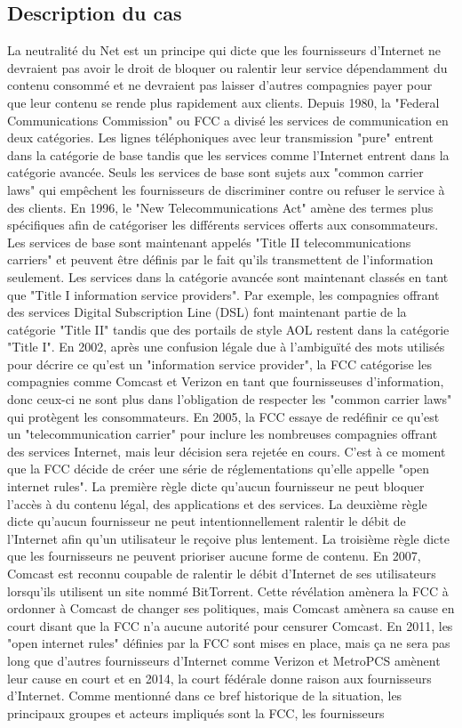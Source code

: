 \documentclass[12pt]{article}
\begin{document}
\subsection{Description du cas}
La neutralité du Net est un principe qui dicte que les fournisseurs d’Internet ne devraient pas avoir le droit de bloquer ou ralentir leur service dépendamment du contenu consommé et ne devraient pas laisser d’autres compagnies payer pour que leur contenu se rende plus rapidement aux clients. Depuis 1980, la "Federal Communications Commission" ou FCC a divisé les services de communication en deux catégories. Les lignes téléphoniques avec leur transmission "pure" entrent dans la catégorie de base tandis que les services comme l’Internet entrent dans la catégorie avancée. Seuls les services de base sont sujets aux "common carrier laws" qui empêchent les fournisseurs de discriminer contre ou refuser le service à des clients. En 1996, le "New Telecommunications Act" amène des termes plus spécifiques afin de catégoriser les différents services offerts aux consommateurs. Les services de base sont maintenant appelés "Title II telecommunications carriers" et peuvent être définis par le fait qu’ils transmettent de l’information seulement. Les services dans la catégorie avancée sont maintenant classés en tant que "Title I information service providers". Par exemple, les compagnies offrant des services Digital Subscription Line (DSL) font maintenant partie de la catégorie "Title II" tandis que des portails de style AOL restent dans la catégorie "Title I". En 2002, après une confusion légale due à l’ambiguïté des mots utilisés pour décrire ce qu’est un "information service provider", la FCC catégorise les compagnies comme Comcast et Verizon en tant que fournisseuses d’information, donc ceux-ci ne sont plus dans l’obligation de respecter les "common carrier laws" qui protègent les consommateurs. En 2005, la FCC essaye de redéfinir ce qu’est un "telecommunication carrier" pour inclure les nombreuses compagnies offrant des services Internet, mais leur décision sera rejetée en cours. C’est à ce moment que la FCC décide de créer une série de réglementations qu’elle appelle "open internet rules". La première règle dicte qu’aucun fournisseur ne peut bloquer l’accès à du contenu légal, des applications et des services. La deuxième règle dicte qu’aucun fournisseur ne peut intentionnellement ralentir le débit de l’Internet afin qu’un utilisateur le reçoive plus lentement. La troisième règle dicte que les fournisseurs ne peuvent prioriser aucune forme de contenu. En 2007, Comcast est reconnu coupable de ralentir le débit d’Internet de ses utilisateurs lorsqu’ils utilisent un site nommé BitTorrent. Cette révélation amènera la FCC à ordonner à Comcast de changer ses politiques, mais Comcast amènera sa cause en court disant que la FCC n’a aucune autorité pour censurer Comcast. En 2011, les "open internet rules" définies par la FCC sont mises en place, mais ça ne sera pas long que d’autres fournisseurs d’Internet comme Verizon et MetroPCS amènent leur cause en court et en 2014, la court fédérale donne raison aux fournisseurs d’Internet. Comme mentionné dans ce bref historique de la situation, les principaux groupes et acteurs impliqués sont la FCC, les fournisseurs 
\end{document}
